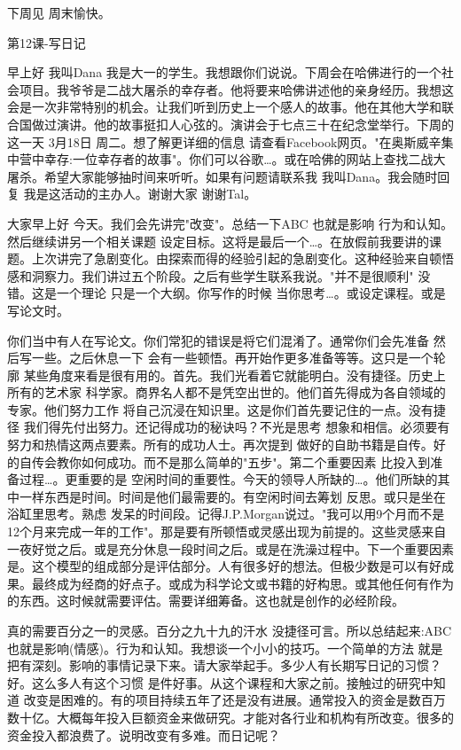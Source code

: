 下周见 周末愉快。 

第12课-写日记 

早上好 我叫Dana 我是大一的学生。我想跟你们说说。下周会在哈佛进行的一个社会项目。我爷爷是二战大屠杀的幸存者。他将要来哈佛讲述他的亲身经历。我想这会是一次非常特别的机会。让我们听到历史上一个感人的故事。他在其他大学和联合国做过演讲。他的故事挺扣人心弦的。演讲会于七点三十在纪念堂举行。下周的这一天 3月18日 周二。想了解更详细的信息 请查看Facebook网页。"在奥斯威辛集中营中幸存:一位幸存者的故事"。你们可以谷歌…。或在哈佛的网站上查找二战大屠杀。希望大家能够抽时间来听听。如果有问题请联系我 我叫Dana。我会随时回复 我是这活动的主办人。谢谢大家 谢谢Tal。 

大家早上好 今天。我们会先讲完"改变"。总结一下ABC 也就是影响 行为和认知。然后继续讲另一个相关课题 设定目标。这将是最后一个…。在放假前我要讲的课题。上次讲完了急剧变化。由探索而得的经验引起的急剧变化。这种经验来自顿悟感和洞察力。我们讲过五个阶段。之后有些学生联系我说。"并不是很顺利" 没错。这是一个理论 只是一个大纲。你写作的时候 当你思考…。或设定课程。或是写论文时。 

你们当中有人在写论文。你们常犯的错误是将它们混淆了。通常你们会先准备 然后写一些。之后休息一下 会有一些顿悟。再开始作更多准备等等。这只是一个轮廓 某些角度来看是很有用的。首先。我们光看着它就能明白。没有捷径。历史上所有的艺术家 科学家。商界名人都不是凭空出世的。他们首先得成为各自领域的专家。他们努力工作 将自己沉浸在知识里。这是你们首先要记住的一点。没有捷径 我们得先付出努力。还记得成功的秘诀吗？不光是思考 想象和相信。必须要有努力和热情这两点要素。所有的成功人士。再次提到 做好的自助书籍是自传。好的自传会教你如何成功。而不是那么简单的"五步"。第二个重要因素 比投入到准备过程…。更重要的是 空闲时间的重要性。今天的领导人所缺的…。他们所缺的其中一样东西是时间。时间是他们最需要的。有空闲时间去筹划 反思。或只是坐在浴缸里思考。熟虑 发呆的时间段。记得J.P.Morgan说过。"我可以用9个月而不是12个月来完成一年的工作"。那是要有所顿悟或灵感出现为前提的。这些灵感来自一夜好觉之后。或是充分休息一段时间之后。或是在洗澡过程中。下一个重要因素是。这个模型的组成部分是评估部分。人有很多好的想法。但极少数是可以有好成果。最终成为经商的好点子。或成为科学论文或书籍的好构思。或其他任何有作为的东西。这时候就需要评估。需要详细筹备。这也就是创作的必经阶段。 

真的需要百分之一的灵感。百分之九十九的汗水 没捷径可言。所以总结起来:ABC 也就是影响(情感)。行为和认知。我想谈一个小小的技巧。一个简单的方法 就是把有深刻。影响的事情记录下来。请大家举起手。多少人有长期写日记的习惯？好。这么多人有这个习惯 是件好事。从这个课程和大家之前。接触过的研究中知道 改变是困难的。有的项目持续五年了还是没有进展。通常投入的资金是数百万 数十亿。大概每年投入巨额资金来做研究。才能对各行业和机构有所改变。很多的资金投入都浪费了。说明改变有多难。而日记呢？ 

